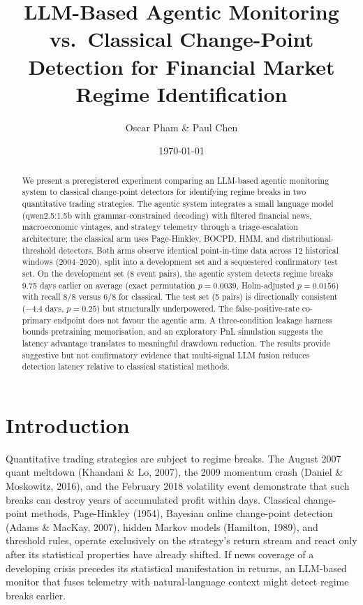\documentclass[10pt,a4paper]{article}
\title{LLM-Based Agentic Monitoring vs.\ Classical Change-Point Detection for
Financial Market Regime Identification}
\author{Oscar Pham \& Paul Chen}
\date{\today}
\begin{document}
\maketitle

\begin{abstract}
We present a preregistered experiment comparing an LLM-based agentic monitoring
system to classical change-point detectors for identifying regime breaks in two
quantitative trading strategies. The agentic system integrates a small language
model (qwen2.5:1.5b with grammar-constrained decoding) with filtered financial
news, macroeconomic vintages, and strategy telemetry through a triage-escalation
architecture; the classical arm uses Page-Hinkley, BOCPD, HMM, and
distributional-threshold detectors. Both arms observe identical point-in-time
data across 12 historical windows (2004--2020), split into a development set and
a sequestered confirmatory test set. On the development set (8 event pairs), the
agentic system detects regime breaks 9.75 days earlier on average (exact
permutation $p = 0.0039$, Holm-adjusted $p = 0.0156$) with recall 8/8 versus 6/8
for classical. The test set (5 pairs) is directionally consistent ($-4.4$ days,
$p = 0.25$) but structurally underpowered. The false-positive-rate co-primary
endpoint does not favour the agentic arm. A three-condition leakage harness
bounds pretraining memorisation, and an exploratory PnL simulation suggests the
latency advantage translates to meaningful drawdown reduction. The results
provide suggestive but not confirmatory evidence that multi-signal LLM fusion
reduces detection latency relative to classical statistical methods.
\end{abstract}

\section{Introduction}\label{sec:intro}

Quantitative trading strategies are subject to regime breaks. The August 2007
quant meltdown (Khandani \& Lo, 2007), the 2009 momentum crash (Daniel \&
Moskowitz, 2016), and the February 2018 volatility event demonstrate that such
breaks can destroy years of accumulated profit within days. Classical
change-point methods, Page-Hinkley (1954), Bayesian online change-point
detection (Adams \& MacKay, 2007), hidden Markov models (Hamilton, 1989), and
threshold rules, operate exclusively on the strategy's return stream and react
only after its statistical properties have already shifted. If news coverage of
a developing crisis precedes its statistical manifestation in returns, an
LLM-based monitor that fuses telemetry with natural-language context might
detect regime breaks earlier.
\end{document}
